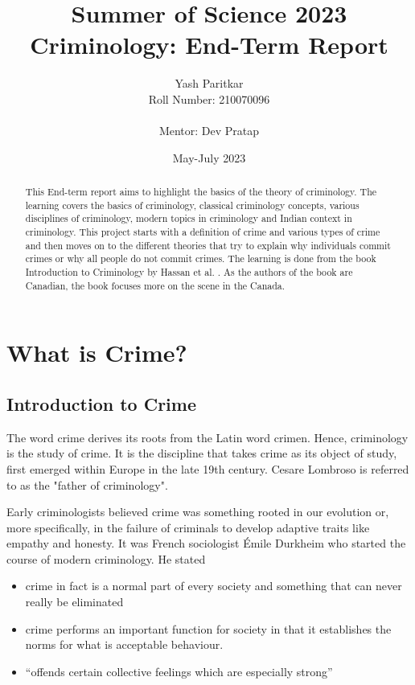 \documentclass{article}
\title{Summer of Science 2023\\
\textbf{Criminology: End-Term Report}}
\author{Yash Paritkar\\
Roll Number: 210070096\\
\\
Mentor: Dev Pratap}
\date{May-July 2023}
\begin{document}
\maketitle

\newpage

\begin{abstract}
    This End-term report aims to highlight the basics of the theory of criminology. The learning covers the basics of criminology, classical criminology concepts, various disciplines of criminology, modern topics in criminology and Indian context in criminology. This project starts with a definition of crime and various types of crime and then moves on to the different theories that try to explain why individuals commit crimes or why all people do not commit crimes. The learning is done from the book Introduction to Criminology by Hassan et al. \cite{ref: Introduction to Criminology}. As the authors of the book are Canadian, the book focuses more on the scene in the Canada.
\end{abstract}

\tableofcontents

\newpage

\section{What is Crime?}

\subsection{Introduction to Crime}
The word crime derives its roots from the Latin word crimen. Hence, criminology is the study of crime. It is the discipline that takes crime as its object of study, first emerged within Europe in the late 19th century. Cesare Lombroso is referred to as the "father of criminology".

Early criminologists believed crime was something rooted in our evolution or, more specifically, in the failure of criminals to develop adaptive traits like empathy and honesty. It was French sociologist Émile Durkheim who started the course of modern criminology. He stated

\begin{itemize}
    \item crime in fact is a normal part of every society and something that can never really be eliminated
    \item crime performs an important function for society in that it establishes the norms for what is acceptable behaviour.
    \item “offends certain collective feelings which are especially strong”
\end{itemize}
\end{document}
